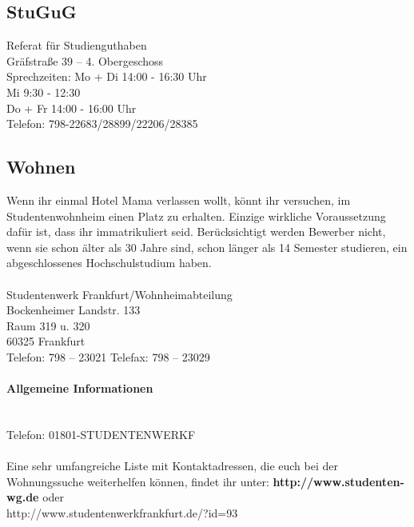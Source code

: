 \subsection*{StuGuG}
Referat für Studienguthaben\\
Gräfstraße 39 – 4. Obergeschoss\\
Sprechzeiten: Mo + Di 14:00 - 16:30 Uhr\\
Mi 9:30 - 12:30\\
Do + Fr 14:00 - 16:00 Uhr\\
Telefon: 798-22683/28899/22206/28385\\
\emailstugug

\subsection*{Wohnen}
Wenn ihr einmal Hotel Mama verlassen wollt, könnt ihr versuchen, im Studentenwohnheim einen Platz zu erhalten. Einzige wirkliche Voraussetzung dafür ist, dass ihr immatrikuliert seid. Berücksichtigt werden Bewerber nicht, wenn sie schon älter als 30 Jahre sind, schon länger als 14 Semester studieren, ein abgeschlossenes Hochschulstudium haben.\\
~\\
Studentenwerk Frankfurt/Wohnheimabteilung\\
Bockenheimer Landstr. 133\\
Raum 319 u. 320\\
60325 Frankfurt\\
Telefon: 798 – 23021 Telefax: 798 – 23029\\
\emailwohnen

\paragraph{Allgemeine Informationen}~\\
Telefon: 01801-STUDENTENWERKF\\
\emailinfo\\
Eine sehr umfangreiche Liste mit Kontaktadressen, die euch bei der Wohnungssuche weiterhelfen können, findet ihr unter:
\textbf{http://www.studenten-wg.de}
oder\\
http://www.studentenwerkfrankfurt.de/?id=93
